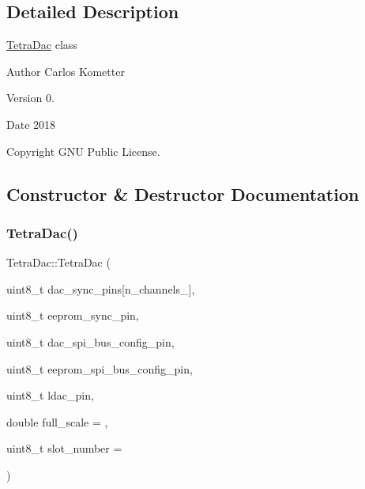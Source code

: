 \subsection{Detailed Description}
\mbox{\hyperlink{classTetraDac}{Tetra\+Dac}} class \begin{DoxyAuthor}{Author}
Carlos Kometter 
\end{DoxyAuthor}
\begin{DoxyVersion}{Version}
0. 
\end{DoxyVersion}
\begin{DoxyDate}{Date}
2018 
\end{DoxyDate}
\begin{DoxyCopyright}{Copyright}
G\+NU Public License. 
\end{DoxyCopyright}


\subsection{Constructor \& Destructor Documentation}
\mbox{\label{classTetraDac_a77131270e115bf47b6c582d53cddb881}} 
\subsubsection{\texorpdfstring{Tetra\+Dac()}{TetraDac()}}
{\footnotesize\ttfamily Tetra\+Dac\+::\+Tetra\+Dac (\begin{DoxyParamCaption}\item[{uint8\+\_\+t}]{dac\+\_\+sync\+\_\+pins\mbox{[}n\+\_\+channels\+\_\+\mbox{]},  }\item[{uint8\+\_\+t}]{eeprom\+\_\+sync\+\_\+pin,  }\item[{uint8\+\_\+t}]{dac\+\_\+spi\+\_\+bus\+\_\+config\+\_\+pin,  }\item[{uint8\+\_\+t}]{eeprom\+\_\+spi\+\_\+bus\+\_\+config\+\_\+pin,  }\item[{uint8\+\_\+t}]{ldac\+\_\+pin,  }\item[{double}]{full\+\_\+scale = {},  }\item[{uint8\+\_\+t}]{slot\+\_\+number = {} }\end{DoxyParamCaption})}

